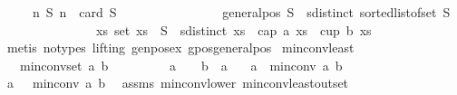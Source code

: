 \begin{isabellebody}
\ \ \ \ {\isasymnotin}\ {\isacharbraceleft}{\kern0pt}n{\isachardot}{\kern0pt}\ {\isasymforall}S{\isachardot}{\kern0pt}\ n\ {\isacharequal}{\kern0pt}\ card\ S\ {\isasymand}\isanewline
\ \ \ \ \ \ \ \ \ \ \ \ \ \ \ general{\isacharunderscore}{\kern0pt}pos\ S\ {\isasymand}\ sdistinct\ {\isacharparenleft}{\kern0pt}sorted{\isacharunderscore}{\kern0pt}list{\isacharunderscore}{\kern0pt}of{\isacharunderscore}{\kern0pt}set\ S{\isacharparenright}{\kern0pt}\ {\isasymlongrightarrow}\isanewline
\ \ \ \ \ \ \ \ \ \ \ \ \ \ \ {\isacharparenleft}{\kern0pt}{\isasymexists}xs{\isachardot}{\kern0pt}\ set\ xs\ {\isasymsubseteq}\ S\ {\isasymand}\ sdistinct\ xs\ {\isasymand}\ {\isacharparenleft}{\kern0pt}cap\ a\ xs\ {\isasymor}\ cup\ b\ xs{\isacharparenright}{\kern0pt}{\isacharparenright}{\kern0pt}{\isacharbraceright}{\kern0pt}{\isachardoublequoteclose}\ \isanewline
\ \ \ \ \isamarkupfalse%
\ {\isacharparenleft}{\kern0pt}metis\ {\isacharparenleft}{\kern0pt}no{\isacharunderscore}{\kern0pt}types{\isacharcomma}{\kern0pt}\ lifting{\isacharparenright}{\kern0pt}\ genpos{\isacharunderscore}{\kern0pt}ex\ gpos{\isacharunderscore}{\kern0pt}generalpos{\isacharparenright}{\kern0pt}\isanewline
{}\isamarkupfalse%
%
\endisatagproof
{\isafoldproof}%
%
\isadelimproof
\isanewline
%
\endisadelimproof
\isanewline
{}\isamarkupfalse%
\ min{\isacharunderscore}{\kern0pt}conv{\isacharunderscore}{\kern0pt}least{\isacharcolon}{\kern0pt}\isanewline
\ \ \ {\isachardoublequoteopen}min{\isacharunderscore}{\kern0pt}conv{\isacharunderscore}{\kern0pt}set\ a\ b\ {\isasymnoteq}\ {\isacharbraceleft}{\kern0pt}{\isacharbraceright}{\kern0pt}{\isachardoublequoteclose}\isanewline
\ \ \ \ \ \ \ {\isachardoublequoteopen}a\ {\isasymge}\ {}{\isachardoublequoteclose}\ \ {\isachardoublequoteopen}b\ {\isasymge}\ a{\isachardoublequoteclose}\isanewline
\ \ \ {\isachardoublequoteopen}a\ {\isasymle}\ min{\isacharunderscore}{\kern0pt}conv\ a\ b{\isachardoublequoteclose}\isanewline
%
\isadelimproof
%
\endisadelimproof
%
\isatagproof
{}\isamarkupfalse%
{\isacharminus}{\kern0pt}\isanewline
\ \ \isamarkupfalse%
\ {\isachardoublequoteopen}a\ {\isacharminus}{\kern0pt}{}\ {\isacharless}{\kern0pt}\ min{\isacharunderscore}{\kern0pt}conv\ a\ b{\isachardoublequoteclose}\ \isamarkupfalse%
\ assms\ min{\isacharunderscore}{\kern0pt}conv{\isacharunderscore}{\kern0pt}lower\ min{\isacharunderscore}{\kern0pt}conv{\isacharunderscore}{\kern0pt}least{\isacharunderscore}{\kern0pt}out{\isacharunderscore}{\kern0pt}set\isanewline

\end{isabellebody}
